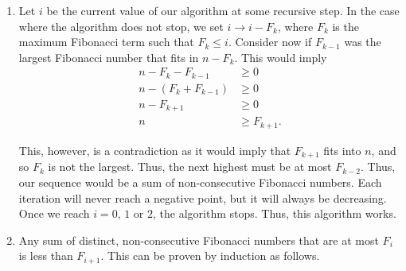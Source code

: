 \documentclass{article}
\begin{document}
\begin{solution}
\begin{enumerate}[label=(\alph*)]
\item Let $i $ be the current value of our algorithm at some recursive step. In the case where the algorithm does not stop, we set $i \to i - F_k$, where $F_k$ is the maximum Fibonacci term such that $F_k \leq i$. Consider now if $F_{k-1}$ was the largest Fibonacci number that fits in $n - F_k$. This would imply
\begin{align*}
	n - F_k - F_{k-1} &\geq 0\\
	n - (F_k + F_{k-1}) & \geq 0\\
	n - F_{k+1} &\geq 0\\
	n &\geq F_{k+1}.
\end{align*}

This, however, is a contradiction as it would imply that $F_{k+1}$ fits into $n$, and so $F_k$ is not the largest. Thus, the next highest must be at most $F_{k-2}$. Thus, our sequence would be a sum of non-consecutive Fibonacci numbers. Each iteration will never reach a negative point, but it will always be decreasing. Once we reach $i = 0$, $1$ or $2$, the algorithm stops. Thus, this algorithm works.

\item Any sum of distinct, non-consecutive Fibonacci numbers that are at most $F_i$ is less than $F_{i+1}$. This can be proven by induction as follows.


\end{enumerate}
\end{solution}
\end{document}
